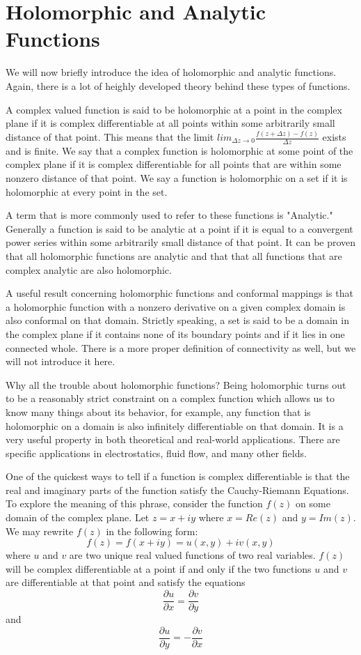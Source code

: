 \section*{Holomorphic and Analytic Functions}

We will now briefly introduce the idea of holomorphic and analytic functions. Again, there is a lot of heighly developed theory behind these types of functions.

A complex valued function is said to be holomorphic at a point in the complex plane if it is complex differentiable at all points within some arbitrarily small distance of that point. This means that the limit $lim_{\Delta z \to 0} \frac{f(z+\Delta z)-f(z)}{\Delta z}$ exists and is finite. We say that a complex function is holomorphic at some point of the complex plane if it is complex differentiable for all points that are within some nonzero distance of that point. We say a function is holomorphic on a set if it is holomorphic at every point in the set.

A term that is more commonly used to refer to these functions is "Analytic." Generally a function is said to be analytic at a point if it is equal to a convergent power series within some arbitrarily small distance of that point. It can be proven that all holomorphic functions are analytic and that that all functions that are complex analytic are also holomorphic.

A useful result concerning holomorphic functions and conformal mappings is that a holomorphic function with a nonzero derivative on a given complex domain is also conformal on that domain. Strictly speaking, a set is said to be a domain in the complex plane if it contains none of its boundary points and if it lies in one connected whole. There is a more proper definition of connectivity as well, but we will not introduce it here.

Why all the trouble about holomorphic functions? Being holomorphic turns out to be a reasonably strict constraint on a complex function which allows us to know many things about its behavior, for example, any function that is holomorphic on a domain is also infinitely differentiable on that domain. It is a very useful property in both theoretical and real-world applications. There are specific applications in electrostatics, fluid flow, and many other fields.

One of the quickest ways to tell if a function is complex differentiable is that the real and imaginary parts of the function satisfy the Cauchy-Riemann Equations. To explore the meaning of this phrase, consider the function $f(z)$ on some domain of the complex plane. Let $z=x+i y$ where $x=Re(z)$ and $y=Im(z)$. We may rewrite $f(z)$ in the following form: $$f(z)=f(x+i y)=u(x,y)+i v(x,y)$$ where $u$ and $v$ are two unique real valued functions of two real variables. $f(z)$ will be complex differentiable at a point if and only if the two functions $u$ and $v$ are differentiable at that point and satisfy the equations $$\frac{\partial u}{\partial x}=\frac{\partial v}{\partial y}$$ and $$\frac{\partial u}{\partial y}=-\frac{\partial v}{\partial x}$$

